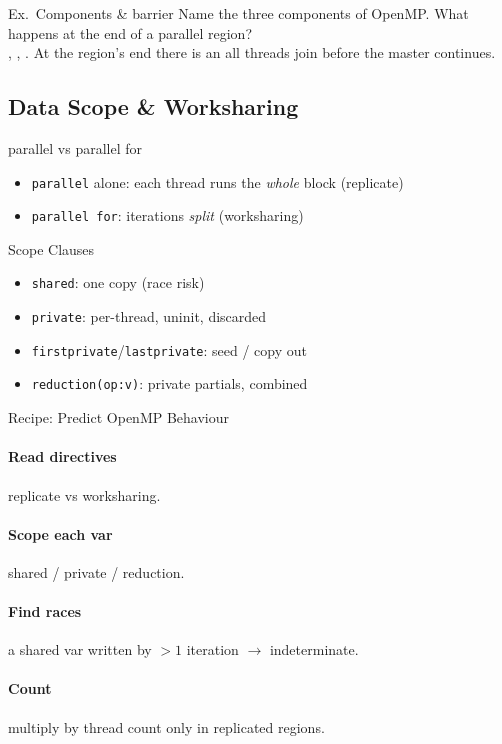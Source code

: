 \begin{example2}{Ex.\ Components \& barrier}
    Name the three components of OpenMP. What happens at the end of a parallel region?
     \\ 
    , , . At the region's end there is an  all threads join before the master continues.
\end{example2}

\multend

\subsection{Data Scope \& Worksharing}


\begin{concept}{parallel vs parallel for}
    \begin{itemize}
        \item \texttt{parallel} alone: each thread runs the \emph{whole} block (replicate)
        \item \texttt{parallel for}: iterations \emph{split} (worksharing)
    \end{itemize}
\end{concept}

\begin{definition}{Scope Clauses}
    \begin{itemize}
        \item \texttt{shared}: one copy (race risk)
        \item \texttt{private}: per-thread, uninit, discarded
        \item \texttt{firstprivate}/\texttt{lastprivate}: seed / copy out
        \item \texttt{reduction(op:v)}: private partials, combined
    \end{itemize}
\end{definition}

\multend



\begin{KR}{Recipe: Predict OpenMP Behaviour}
    \paragraph{Read directives} replicate vs worksharing.
    \paragraph{Scope each var} shared / private / reduction.
    \paragraph{Find races} a shared var written by $>1$ iteration $\to$ indeterminate.
    \paragraph{Count} multiply by thread count only in replicated regions.
\end{KR}


